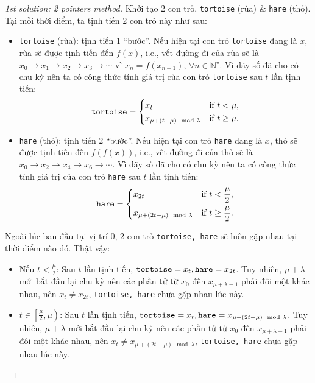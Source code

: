 \documentclass{article}
\begin{document}
\begin{proof}[1st solution: 2 pointers method]
     Khởi tạo 2 con trỏ, {\tt tortoise} (rùa) \& {\tt hare} (thỏ). Tại mỗi thời điểm, ta tịnh tiến 2 con trỏ này như sau:
     \begin{itemize}
         \item {\tt tortoise} (rùa): tịnh tiến 1 ``bước''. Nếu hiện tại con trỏ {\tt tortoise} đang là $x$, rùa sẽ được tịnh tiến đến $f(x)$, i.e., vết đường đi của rùa sẽ là $x_0\to x_1\to x_2\to x_3\to\cdots$ vì $x_n = f(x_{n-1})$, $\forall n\in\mathbb{N}^\star$. Vì dãy số đã cho có chu kỳ nên ta có công thức tính giá trị của con trỏ {\tt tortoise} sau $t$ lần tịnh tiến:
         \begin{equation*}
             {\tt tortoise} = \left\{\begin{split}
                 &x_t&&\mbox{if } t < \mu,\\
                 &x_{\mu + (t - \mu)\mod\lambda}&&\mbox{if } t\ge\mu.
             \end{split}\right.
         \end{equation*}
         \item {\tt hare} (thỏ): tịnh tiến 2 ``bước''. Nếu hiện tại con trỏ {\tt hare} đang là $x$, thỏ sẽ được tịnh tiến đến $f(f(x))$, i.e., vết đường đi của thỏ sẽ là $x_0\to x_2\to x_4\to x_6\to\cdots$. Vì dãy số đã cho có chu kỳ nên ta có công thức tính giá trị của con trỏ {\tt hare} sau $t$ lần tịnh tiến:
         \begin{equation*}
             {\tt hare} = \left\{\begin{split}
                 &x_{2t}&&\mbox{if } t < \frac{\mu}{2},\\
                 &x_{\mu + (2t - \mu)\mod\lambda}&&\mbox{if } t\ge\frac{\mu}{2}.
             \end{split}\right.
         \end{equation*}
     \end{itemize}
     Ngoài lúc ban đầu tại vị trí 0, 2 con trỏ {\tt tortoise, hare} sẽ luôn gặp nhau tại thời điểm nào đó. Thật vậy:
     \begin{itemize}
         \item Nếu $t < \frac{\mu}{2}$: Sau $t$ lần tịnh tiến, ${\tt tortoise} = x_t,{\tt hare} = x_{2t}$. Tuy nhiên, $\mu + \lambda$ mới bắt đầu lại chu kỳ nên các phần tử từ $x_0$ đến $x_{\mu + \lambda - 1}$ phải đôi một khác nhau, nên $x_t\ne x_{2t}$, {\tt tortoise, hare} chưa gặp nhau lúc này.
         \item $t\in\left[\frac{\mu}{2},\mu\right)$: Sau $t$ lần tịnh tiến, ${\tt tortoise} = x_t,{\tt hare} = x_{\mu + (2t - \mu)\mod\lambda}$. Tuy nhiên, $\mu + \lambda$ mới bắt đầu lại chu kỳ nên các phần tử từ $x_0$ đến $x_{\mu + \lambda - 1}$ phải đôi một khác nhau, nên $x_t\ne x_{\mu + (2t - \mu)\mod\lambda}$, {\tt tortoise, hare} chưa gặp nhau lúc này.

\end{itemize}
\end{proof}
\end{document}
